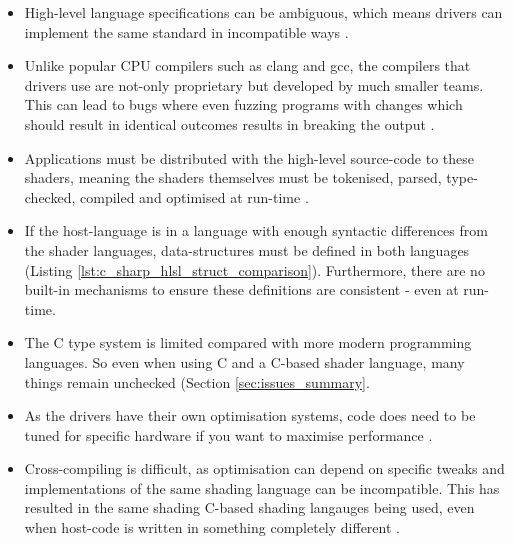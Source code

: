 \documentclass[a4paper,12pt,twoside,openright]{report}
\begin{document}
\begin{itemize}

    \item High-level language specifications can be ambiguous, which means
    drivers can implement the same standard in incompatible ways \cite{TODO}.

    \item Unlike popular CPU compilers such as clang and gcc, the compilers
    that drivers use are not-only proprietary but developed by much smaller
    teams. This can lead to bugs where even fuzzing programs with changes which
    should result in identical outcomes results in breaking the output
    \cite{GLFuzz}. %

    \item Applications must be distributed with the high-level source-code to
    these shaders, meaning the shaders themselves must be tokenised, parsed,
    type-checked, compiled and optimised at run-time \cite{TODO}.

    \item If the host-language is in a language with enough syntactic
    differences from the shader languages, data-structures must be defined in
    both languages (Listing \ref{lst:c_sharp_hlsl_struct_comparison}).
    Furthermore, there are no built-in mechanisms to ensure these definitions
    are consistent - even at run-time.

    \item The C type system is limited compared with more modern programming
    languages. So even when using C and a C-based shader language, many things
    remain unchecked (Section \ref{sec:issues_summary}.

    \item As the drivers have their own optimisation systems, code does need to
    be tuned for specific hardware if you want to maximise performance
    \cite{TODO}.

    \item Cross-compiling is difficult, as optimisation can depend on specific
    tweaks and implementations of the same shading language can be
    incompatible. This has resulted in the same shading C-based shading
    langauges being used, even when host-code is written in something
    completely different \cite{TODO}.

\end{itemize}
\end{document}
